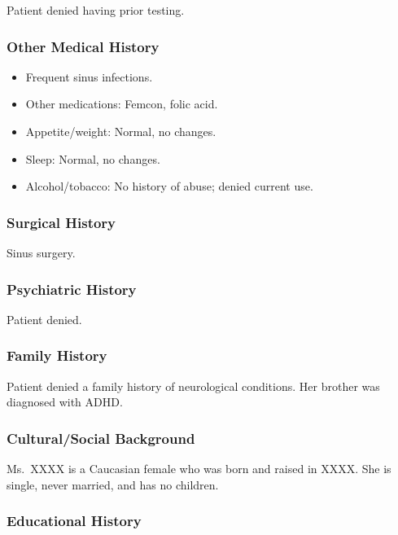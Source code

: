 \documentclass[
  letterpaper,
  DIV=11,
  numbers=noendperiod,
  oneside]{scrartcl}
\providecommand{\tightlist}{%
  \setlength{\itemsep}{0pt}\setlength{\parskip}{0pt}}\usepackage{longtable,booktabs,array}
\begin{document}
Patient denied having prior testing.

\hypertarget{other-medical-history}{%
\subsubsection{Other Medical History}\label{other-medical-history}}

\begin{itemize}
\tightlist
\item
  Frequent sinus infections.
\item
  Other medications: Femcon, folic acid.
\item
  Appetite/weight: Normal, no changes.
\item
  Sleep: Normal, no changes.
\item
  Alcohol/tobacco: No history of abuse; denied current use.
\end{itemize}

\hypertarget{surgical-history}{%
\subsubsection{Surgical History}\label{surgical-history}}

Sinus surgery.

\hypertarget{psychiatric-history}{%
\subsubsection{Psychiatric History}\label{psychiatric-history}}

Patient denied.

\hypertarget{family-history}{%
\subsubsection{Family History}\label{family-history}}

Patient denied a family history of neurological conditions. Her brother
was diagnosed with ADHD.

\hypertarget{culturalsocial-background}{%
\subsubsection{Cultural/Social
Background}\label{culturalsocial-background}}

Ms.~XXXX is a Caucasian female who was born and raised in XXXX. She is
single, never married, and has no children.

\hypertarget{educational-history}{%
\subsubsection{Educational History}\label{educational-history}}
\end{document}

